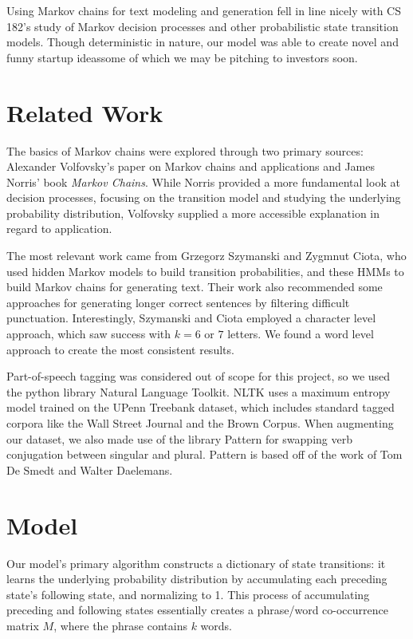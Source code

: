 \documentclass[11pt]{article}
\begin{document}
Using Markov chains for text modeling and generation fell in line nicely with CS 182's study of Markov decision processes and other probabilistic state transition models. Though deterministic in nature, our model was able to create novel and funny startup ideas\textemdash some of which we may be pitching to investors soon.

\section{Related Work}

The basics of Markov chains were explored through two primary sources: Alexander Volfovsky's paper on Markov chains and applications\cite{volfovsky2007} and James Norris' book \textit{Markov Chains}.\cite{norris1998} While Norris provided a more fundamental look at decision processes, focusing on the transition model and studying the underlying probability distribution, Volfovsky supplied a more accessible explanation in regard to application.

The most relevant work came from Grzegorz Szymanski and Zygmnut Ciota, who used hidden Markov models to build transition probabilities, and these HMMs to build Markov chains for generating text.\cite{szymanski2014} Their work also recommended some approaches for generating longer correct sentences by filtering difficult punctuation. Interestingly, Szymanski and Ciota employed a character level approach, which saw success with \(k = 6\) or \(7\) letters. We found a word level approach to create the most consistent results.

Part-of-speech tagging was considered out of scope for this project, so we used the python library Natural Language Toolkit.\cite{bird2015} NLTK uses a maximum entropy model trained on the UPenn Treebank dataset, which includes standard tagged corpora like the Wall Street Journal and the Brown Corpus.\cite{ratnaparkhi1996} When augmenting our dataset, we also made use of the library Pattern for swapping verb conjugation between singular and plural. Pattern is based off of the work of Tom De Smedt and Walter Daelemans.
\cite{desmedt2015}

\section{Model}

Our model's primary algorithm constructs a dictionary of state transitions: it  learns the underlying probability distribution by accumulating each preceding state's following state, and normalizing to 1. This process of accumulating preceding and following states essentially creates a phrase/word co-occurrence matrix \(M\), where the phrase contains \(k\) words.
\end{document}
